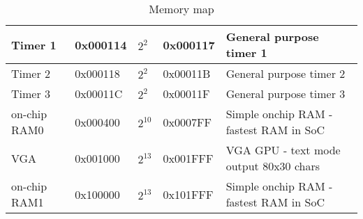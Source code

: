 \begin{table}[h]
\begin{tabular}{|l|l|l|l|l|}
        Timer 1             & 0x000114      & $2^{2}$       & 0x000117     & General purpose timer 1                        \\ \hline
        Timer 2             & 0x000118      & $2^{2}$       & 0x00011B     & General purpose timer 2                        \\ \hline
        Timer 3             & 0x00011C      & $2^{2}$       & 0x00011F     & General purpose timer 3                        \\ \hline
        on-chip RAM0        & 0x000400      & $2^{10}$      & 0x0007FF     & Simple onchip RAM - fastest RAM in SoC         \\ \hline
        VGA                 & 0x001000      & $2^{13}$      & 0x001FFF     & VGA GPU - text mode output 80x30 chars         \\ \hline
        on-chip RAM1        & 0x100000      & $2^{13}$      & 0x101FFF     & Simple onchip RAM - fastest RAM in SoC         \\ \hline
    \end{tabular}
    \caption{Memory map}
    \label{tab:memory_map}
\end{table}
